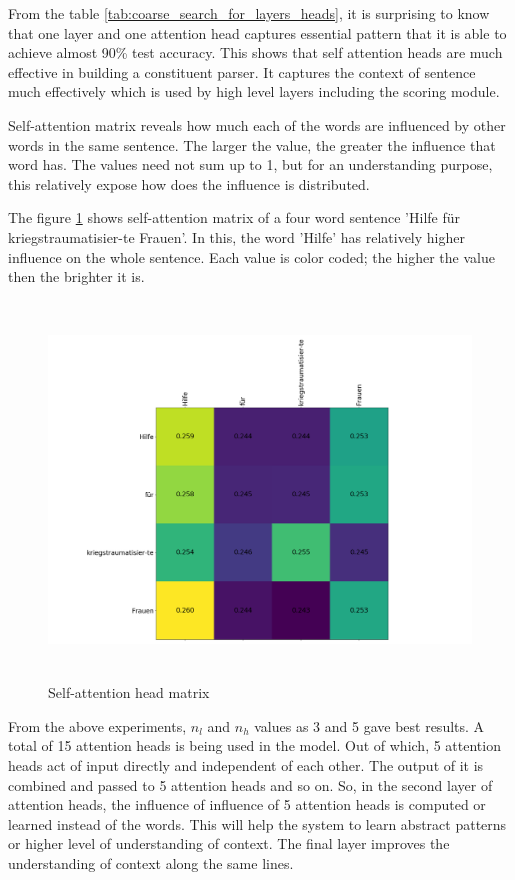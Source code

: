 \documentclass[a4paper, 11pt]{article}
\begin{document}
From the table \ref{tab:coarse_search_for_layers_heads}, it is surprising to know that one layer and one attention head captures essential pattern that it is able to achieve almost 90\% test accuracy. This shows that self attention heads are much effective in building a constituent parser. It captures the context of sentence much effectively which is used by high level layers including the scoring module.

Self-attention matrix reveals how much each of the words are influenced by other words in the same sentence. The larger the value, the greater the influence that word has. The values need not sum up to 1, but for an understanding purpose, this relatively expose how does the influence is distributed. 

The figure \ref{fig:self-attention-head-matrix} shows self-attention matrix of a four word sentence 'Hilfe für kriegstraumatisier-te Frauen'. In this, the word 'Hilfe' has relatively higher influence on the whole sentence. Each value is color coded; the higher the value then the brighter it is.

\begin{figure}[H]
    \centering
    \includegraphics[width=\textwidth,height=10cm,keepaspectratio=true]
    {attention-head-matrix.png}
    \caption{
        Self-attention head matrix
    }
    \label{fig:self-attention-head-matrix}
\end{figure}

From the above experiments, $n_l$ and $n_h$ values as 3 and 5 gave best results. A total of 15 attention heads is being used in the model. Out of which, 5 attention heads act of input directly and independent of each other. The output of it is combined and passed to 5 attention heads and so on.  So, in the second layer of attention heads, the influence of influence of 5 attention heads is computed or learned instead of the words. This will help the system to learn abstract patterns or higher level of understanding of context. The final layer improves the understanding of context along the same lines.
\end{document}
